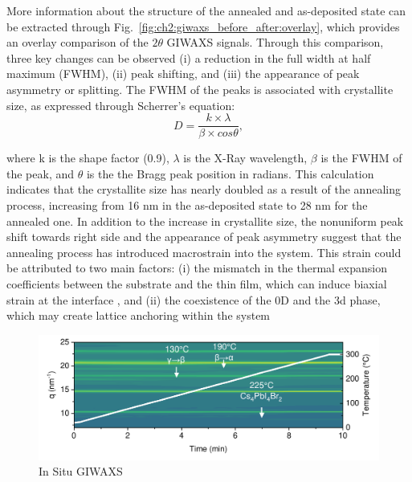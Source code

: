 More information about the structure of the annealed and as-deposited state can be extracted through Fig.~\ref{fig:ch2:giwaxs_before_after:overlay}, which provides an overlay comparison of the $2\theta$ GIWAXS signals. Through this comparison, three key changes can be observed (i) a reduction in the full width at half maximum (FWHM), (ii) peak shifting, and (iii) the appearance of peak asymmetry or splitting. The FWHM of the peaks is associated with crystallite size, as expressed through Scherrer's equation: 
 \begin{equation}
     D = \frac{k \times \lambda}{\beta \times cos\theta},
 \end{equation}

where k is the shape factor (0.9), $\lambda$ is the X-Ray wavelength, $\beta$ is the FWHM of the peak, and $\theta$ is the the Bragg peak position in radians. This calculation indicates that the crystallite size has nearly doubled as a result of the annealing process, increasing from 16 nm in the as-deposited state to 28 nm for the annealed one. In addition to the increase in crystallite size, the nonuniform peak shift towards right side and the appearance of peak asymmetry suggest that the annealing process has introduced macrostrain into the system. This strain could be attributed to two main factors: (i) the mismatch in the thermal expansion coefficients between the substrate and the thin film, which can induce biaxial strain at the interface \cite{Steele2019ThermalFilms}, and (ii) the coexistence of the 0D  and the 3d  phase, which may create lattice anchoring within the system \cite{Steele2022AnFilms, Saha2024Oxygen-MediatedPerformance}

\begin{figure}
  \centering
  \medskip
  \includegraphics[width=\textwidth]{chapters/material_properties/images/GIWAXS_In_Situ.pdf}
  \caption[Short caption for Table of Figures]{In Situ GIWAXS}
  \label{fig:ch2:giwaxs_insitu}
\end{figure}


